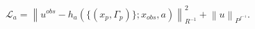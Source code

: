 \documentclass{article}
\newcommand{\bv}{\bm{v}}
\newcommand{\norm}[1]{\left\lVert #1 \right\rVert}
\begin{document}
\begin{equation*}
    \mathcal L_a =  \norm{u^{obs} - h_a(\{(x_p, \Gamma_p)\}; x_{obs}, a)}^2_{R^{-1}} + \norm{u}_{P^f^{-1}}.
\end{equation*}
















\end{document}
